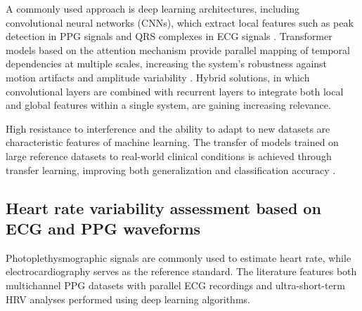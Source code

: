 \documentclass[journal]{IEEEtran}
\begin{document}
\newpage
A commonly used approach is deep learning architectures, including convolutional neural networks (CNNs), which extract local features such as peak detection in PPG signals and QRS complexes in ECG signals \cite{14}. Transformer models based on the attention mechanism provide parallel mapping of temporal dependencies at multiple scales, increasing the system's robustness against motion artifacts and amplitude variability \cite{15}. Hybrid solutions, in which convolutional layers are combined with recurrent layers to integrate both local and global features within a single system, are gaining increasing relevance.


High resistance to interference and the ability to adapt to new datasets are characteristic features of machine learning. The transfer of models trained on large reference datasets to real-world clinical conditions is achieved through transfer learning, improving both generalization and classification accuracy \cite{16}.

\subsection{Heart rate variability assessment based on ECG and PPG waveforms}
Photoplethysmographic signals are commonly used to estimate heart rate, while electrocardiography serves as the reference standard. The literature features both multichannel PPG datasets with parallel ECG recordings and ultra-short-term HRV analyses performed using deep learning algorithms.
\end{document}
